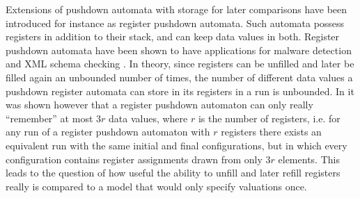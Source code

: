 \documentclass[a4paper,UKenglish,cleveref, autoref, thm-restate]{lipics-v2021}
\begin{document}
Extensions of pushdown automata with storage for later comparisons
have been introduced for instance as register pushdown automata. 
Such automata possess registers in addition to their stack, and can keep data values in both.
Register pushdown automata have been shown to have applications for malware detection and XML schema checking \cite{senda2021forward, senda2021ltl}. 
In theory, since registers can be unfilled and later be filled again an unbounded number of times, the number of different data values a pushdown register automata can store in its registers in a run is unbounded.  
In \cite{murawski2017reachability} it was shown however that a register pushdown automaton can
only really ``remember'' at most  $3r$ data values, where $r$ is the number of registers,
i.e. for any run of a register pushdown automaton with $r$ registers there exists an equivalent run %
 with the same initial and final conﬁgurations, but in which every configuration contains register assignments drawn from only $3r$ elements. This 
 leads to
 the
  question
  of
   how useful the ability to unfill and later refill registers really is compared to a model that would only specify valuations once.



%
\end{document}
